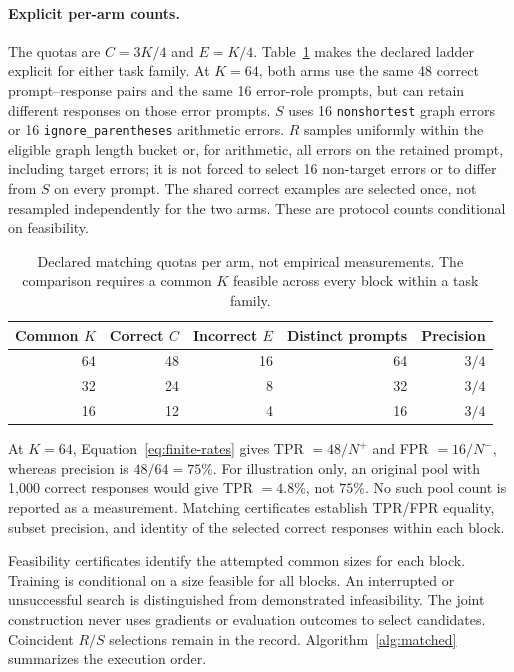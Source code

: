 \paragraph{Explicit per-arm counts.}
The quotas are $C=3K/4$ and $E=K/4$. Table~\ref{tab:subset-counts} makes the
declared ladder explicit for either task family. At $K=64$, both arms use
the same 48 correct prompt--response pairs and the same 16 error-role
prompts, but can retain different responses on those error prompts.
$S$ uses 16 \texttt{nonshortest} graph errors or 16
\texttt{ignore\_parentheses} arithmetic errors. $R$ samples uniformly
within the eligible graph length bucket or, for arithmetic, all errors on
the retained prompt, including target errors; it is not
forced to select 16 non-target errors or to differ from $S$ on every prompt.
The shared correct examples are selected once, not resampled independently
for the two arms. These are protocol counts conditional on feasibility.

\begin{table}[H]
\caption{Declared matching quotas per arm, not empirical measurements.
The comparison requires a common $K$ feasible across every block within a task family.}
\label{tab:subset-counts}
\centering
\begin{tabular}{@{}rrrrr@{}}
\toprule
Common $K$ & Correct $C$ & Incorrect $E$ & Distinct prompts & Precision\\
\midrule
64 & 48 & 16 & 64 & $3/4$\\
32 & 24 & 8 & 32 & $3/4$\\
16 & 12 & 4 & 16 & $3/4$\\
\bottomrule
\end{tabular}
\end{table}

At $K=64$, Equation~\eqref{eq:finite-rates} gives TPR $=48/N^+$ and
FPR $=16/N^-$, whereas precision is $48/64=75\%$. For illustration only,
an original pool with 1,000 correct responses would give TPR $=4.8\%$,
not $75\%$. No such pool count is reported as a measurement.
Matching certificates establish TPR/FPR equality, subset precision, and
identity of the selected correct responses within each block.

Feasibility certificates identify the attempted common sizes for each
block. Training is conditional on a size feasible for all blocks.
An interrupted or unsuccessful search is distinguished from
demonstrated infeasibility. The joint construction never uses gradients or evaluation
outcomes to select candidates. Coincident $R/S$ selections remain in the
record. Algorithm~\ref{alg:matched} summarizes the execution order.

